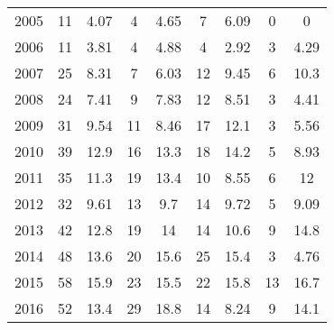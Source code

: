 \begin{table}[htbp]
\begin{tabular}{l*{8}{c}}
2005      &       11&     4.07&        4&     4.65&        7&     6.09&        0&        0\\
2006      &       11&     3.81&        4&     4.88&        4&     2.92&        3&     4.29\\
2007      &       25&     8.31&        7&     6.03&       12&     9.45&        6&     10.3\\
2008      &       24&     7.41&        9&     7.83&       12&     8.51&        3&     4.41\\
2009      &       31&     9.54&       11&     8.46&       17&     12.1&        3&     5.56\\
2010      &       39&     12.9&       16&     13.3&       18&     14.2&        5&     8.93\\
2011      &       35&     11.3&       19&     13.4&       10&     8.55&        6&       12\\
2012      &       32&     9.61&       13&      9.7&       14&     9.72&        5&     9.09\\
2013      &       42&     12.8&       19&       14&       14&     10.6&        9&     14.8\\
2014      &       48&     13.6&       20&     15.6&       25&     15.4&        3&     4.76\\
2015      &       58&     15.9&       23&     15.5&       22&     15.8&       13&     16.7\\
2016      &       52&     13.4&       29&     18.8&       14&     8.24&        9&     14.1\\
\hline\hline
\end{tabular}
\end{table}
